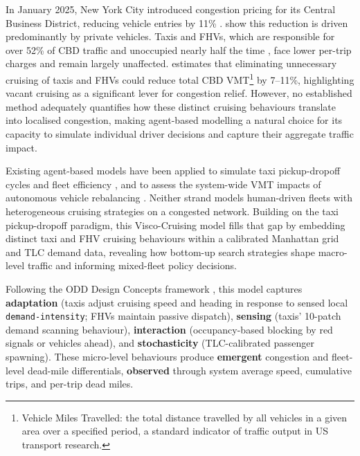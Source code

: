 \documentclass{article}
\begin{document}
In January 2025, New York City introduced congestion pricing for its Central Business District, reducing vehicle entries by 11\% \parencite{cook2025}. \textcite{ostrovsky2024effective} show this reduction is driven predominantly by private vehicles. Taxis and FHVs, which are responsible for over 52\% of CBD traffic \parencite{tmrb2023} and unoccupied nearly half the time \parencite{cramer2016}, face lower per-trip charges and remain largely unaffected. \textcite{schaller2017} estimates that eliminating unnecessary cruising of taxis and FHVs could reduce total CBD VMT\footnote{Vehicle Miles Travelled: the total distance travelled by all vehicles in a given area over a specified period, a standard indicator of traffic output in US transport research.} by 7--11\%, highlighting vacant cruising as a significant lever for congestion relief. However, no established method adequately quantifies how these distinct cruising behaviours translate into localised congestion, making agent-based modelling a natural choice for its capacity to simulate individual driver decisions and capture their aggregate traffic impact.

Existing agent-based models have been applied to simulate taxi pickup-dropoff cycles and fleet efficiency \parencite{salanovagrau2013,ranjit2018}, and to assess the system-wide VMT impacts of autonomous vehicle rebalancing \parencite{fagnant2014,azevedo2020}. Neither strand models human-driven fleets with heterogeneous cruising strategies on a congested network. Building on the taxi pickup-dropoff paradigm, this Visco-Cruising model fills that gap by embedding distinct taxi and FHV cruising behaviours within a calibrated Manhattan grid and TLC demand data, revealing how bottom-up search strategies shape macro-level traffic and informing mixed-fleet policy decisions.

Following the ODD Design Concepts framework \parencite{grimm2020}, this model captures \textbf{adaptation} (taxis adjust cruising speed and heading in response to sensed local \texttt{demand-intensity}; FHVs maintain passive dispatch), \textbf{sensing} (taxis' 10-patch demand scanning behaviour), \textbf{interaction} (occupancy-based blocking by red signals or vehicles ahead), and \textbf{stochasticity} (TLC-calibrated passenger spawning). These micro-level behaviours produce \textbf{emergent} congestion and fleet-level dead-mile differentials, \textbf{observed} through system average speed, cumulative trips, and per-trip dead miles.

\newpage
\printbibliography
\end{document}
